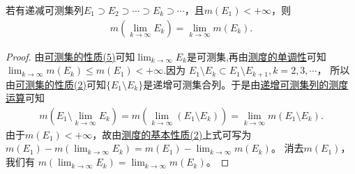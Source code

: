 \documentclass[../../main.tex]{subfiles}%
\begin{document}
\begin{corollary}[递减可测集列的测度运算]\label{corollary:递减可测集列的测度运算}
若有递减可测集列$E_1\supset E_2\supset\cdots\supset E_k\supset\cdots$，且$m(E_1)<+\infty$，则
\begin{align}
m\left(\lim_{k\to\infty}E_k\right)=\lim_{k\to\infty}m(E_k).\label{eq:2.5}
\end{align}
\end{corollary}
\begin{proof}
由\hyperref[theorem:可测集的性质]{可测集的性质(5)}可知$\lim_{k\to\infty}E_k$是可测集,再由\hyperref[theorem:测度的基本性质]{测度的单调性}可知$\lim_{k\to\infty}m(E_k)\leqslant  m(E_1)<+\infty$.因为
$E_1\setminus E_k\subset E_1\setminus E_{k + 1},k = 2,3,\cdots$，
所以由\hyperref[theorem:可测集的性质]{可测集的性质(2)}可知$\{E_1\setminus E_k\}$是递增可测集合列。于是由\hyperref[theorem:递增可测集列的测度运算]{递增可测集列的测度运算}可知
\begin{align*}
m\left(E_1\setminus\lim_{k\to\infty}E_k\right)=m\left(\lim_{k\to\infty}(E_1\setminus E_k)\right)
=\lim_{k\to\infty}m(E_1\setminus E_k).
\end{align*}
由于$m(E_1)<+\infty$，故由\hyperref[theorem:测度的基本性质]{测度的基本性质(2)}上式可写为
$m(E_1)-m\left(\lim_{k\to\infty}E_k\right)=m(E_1)-\lim_{k\to\infty}m(E_k)$。
消去$m(E_1)$，我们有
$m\left(\lim_{k\to\infty}E_k\right)=\lim_{k\to\infty}m(E_k)$。 
\end{proof}
\end{document}

